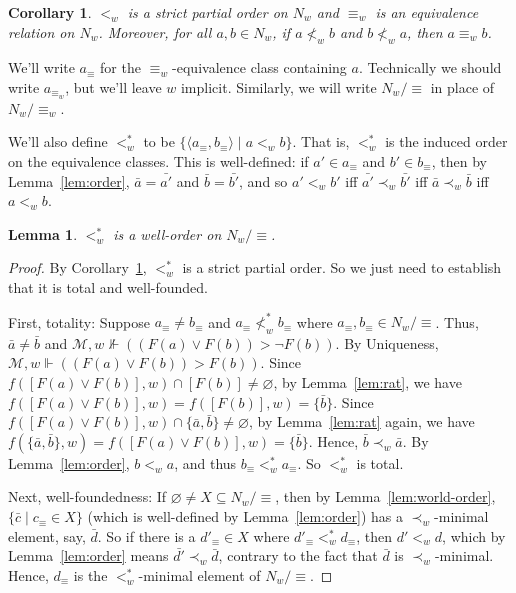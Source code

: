 \documentclass[12pt]{article}
\newtheorem{lemma}{Lemma}
\newtheorem{corollary}{Corollary}
\newcommand{\tup}[1]{\langle #1 \rangle}
\newcommand{\would}{\mathbin{>}}
\begin{document}
\begin{corollary}\label{cor:preorder}
    $<_w$ is a strict partial order on $N_w$ and $\equiv_w$ is an equivalence relation on $N_w$. Moreover, for all $a,b \in N_w$, if $a \nless_w b$ and $b \nless_w a$, then $a \equiv_w b$. 
\end{corollary}

We'll write $a_\equiv$ for the $\equiv_w$-equivalence class containing $a$. 
Technically we should write $a_{\equiv_w}$, but we'll leave $w$ implicit. 
Similarly, we will write $N_w/\equiv$ in place of $N_w/\equiv_w$. 

We'll also define $<_w^*$ to be $\{\tup{a_\equiv,b_\equiv} \mid a <_w b\}$. 
That is, $<_w^*$ is the induced order on the equivalence classes.
This is well-defined: if $a' \in a_\equiv$ and $b' \in b_\equiv$, then by Lemma~\ref{lem:order}, $\bar{a} = \bar{a'}$ and $\bar{b} = \bar{b'}$, and so $a' <_w b'$ iff $\bar{a'} \prec_w \bar{b'}$ iff $\bar{a} \prec_w \bar{b}$ iff $a <_w b$. 

\begin{lemma}\label{lem:well-order}
    $<_w^*$ is a well-order on $N_w/\equiv$. 
\end{lemma}

\begin{proof}
    By Corollary~\ref{cor:preorder}, $<_w^*$ is a strict partial order. 
    So we just need to establish that it is total and well-founded. 
    
    First, totality: 
    Suppose $a_\equiv \neq b_\equiv$ and $a_\equiv \nless_w^* b_\equiv$ where $a_\equiv,b_\equiv \in N_w/\equiv$. 
    Thus, $\bar{a} \neq \bar{b}$ and $\mathcal{M},w \nVdash ((F(a) \vee F(b)) \would \neg F(b))$. 
    By Uniqueness, $\mathcal{M},w \Vdash ((F(a) \vee F(b)) \would F(b))$. 
    Since $f([F(a) \vee F(b)],w) \cap [F(b)] \neq \varnothing$, by Lemma~\ref{lem:rat}, we have $f([F(a) \vee F(b)],w) = f([F(b)],w) = \{\bar{b}\}$. 
    Since $f([F(a) \vee F(b)],w) \cap \{\bar{a},\bar{b}\} \neq \varnothing$, by Lemma~\ref{lem:rat} again, we have $f(\{\bar{a},\bar{b}\},w) = f([F(a) \vee F(b)],w) = \{\bar{b}\}$. 
    Hence, $\bar{b} \prec_w \bar{a}$. 
    By Lemma~\ref{lem:order}, $b <_w a$, and thus $b_\equiv <_w^* a_\equiv$. 
    So $<_w^*$ is total. 

    Next, well-foundedness: 
    If $\varnothing \neq X \subseteq N_w/\equiv$, then by Lemma~\ref{lem:world-order}, $\{\bar{c} \mid c_\equiv \in X\}$ (which is well-defined by Lemma~\ref{lem:order}) has a $\prec_w$-minimal element, say, $\bar{d}$. 
    So if there is a $d'_\equiv \in X$ where $d'_\equiv <_w^* d_\equiv$, then $d' <_w d$, which by Lemma~\ref{lem:order} means $\bar{d'} \prec_w \bar{d}$, contrary to the fact that $\bar{d}$ is $\prec_w$-minimal. 
    Hence, $d_\equiv$ is the $<_w^*$-minimal element of $N_w/\equiv$. 
\end{proof}
\end{document}
